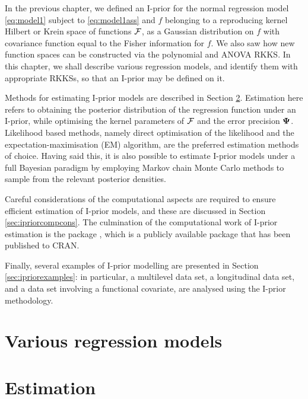 \documentclass[a4paper,showframe,11pt]{report}
\begin{document}

In the previous chapter, we defined an I-prior for the normal regression model \eqref{eq:model1} subject to \eqref{eq:model1ass} and $f$ belonging to a reproducing kernel Hilbert or Krein space of functions ${\mathcal F}$, as a Gaussian distribution on $f$ with covariance function equal to the Fisher information for $f$.
We also saw how new function spaces can be constructed via the polynomial and ANOVA RKKS.
In this chapter, we shall describe various regression models, and identify them with appropriate RKKSs, so that an I-prior may be defined on it.

Methods for estimating I-prior models are described in Section \ref{sec:ipriorestimation}.
Estimation here refers to obtaining the posterior distribution of the regression function under an I-prior, while optimising the kernel parameters of ${\mathcal F}$ and the error precision ${\bm\Psi}$.
Likelihood based methods, namely direct optimisation of the likelihood and the expectation-maximisation (EM) algorithm, are the preferred estimation methods of choice.
Having said this, it is also possible to estimate I-prior models under a full Bayesian paradigm by employing Markov chain Monte Carlo methods to sample from the relevant posterior densities.

Careful considerations of the computational aspects are required to ensure efficient estimation of I-prior models, and these are discussed in Section \ref{sec:ipriorcompcons}.
The culmination of the computational work of I-prior estimation is the  package \citep{jamil2017}, which is a publicly available  package that has been published to CRAN.

Finally, several examples of I-prior modelling are presented in Section \ref{sec:ipriorexamples}: in particular, a multilevel data set, a longitudinal data set, and a data set involving a functional covariate, are analysed using the I-prior methodology.

\newpage
\section{Various regression models}\label{sec:various-regression}


\section{Estimation}\label{sec:ipriorestimation}

\end{document}
